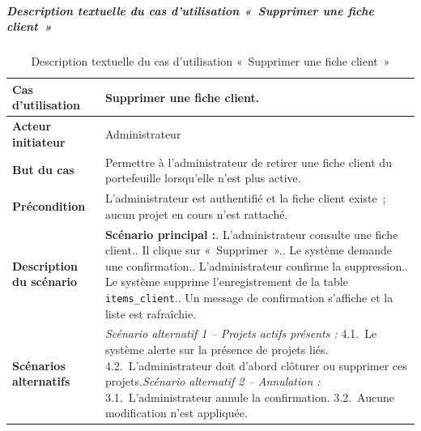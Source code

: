 \subparagraph{Description textuelle du cas d'utilisation «~Supprimer une fiche client~»}

\begin{table}[H]
  \caption{Description textuelle du cas d'utilisation «~Supprimer une fiche client~»}
  \label{tab:cu-supprimer-client}
  \centering
  \begin{tabularx}{\textwidth}{|L{3.8cm}|X|}
    \hline
    \textbf{Cas d'utilisation} & Supprimer une fiche client. \\
    \hline
    \textbf{Acteur initiateur} & Administrateur \\
    \hline
    \textbf{But du cas} & Permettre à l'administrateur de retirer une fiche client du portefeuille lorsqu'elle n'est plus active. \\
    \hline
    \textbf{Précondition} & L'administrateur est authentifié et la fiche client existe~; aucun projet en cours n'est rattaché. \\
    \hline
    \textbf{Description du scénario} &
    \textbf{Scénario principal :}. L'administrateur consulte une fiche client.. Il clique sur «~Supprimer~».. Le système demande une confirmation.. L'administrateur confirme la suppression.. Le système supprime l'enregistrement de la table \texttt{items\_client}.. Un message de confirmation s'affiche et la liste est rafraîchie.\\
    \hline
    \textbf{Scénarios alternatifs} &
    \textit{Scénario alternatif 1 -- Projets actifs présents :}\newline
    \hspace*{6pt}4.1.~Le système alerte sur la présence de projets liés.\newline
    \hspace*{6pt}4.2.~L'administrateur doit d'abord clôturer ou supprimer ces projets.\newline[2pt]
    \textit{Scénario alternatif 2 -- Annulation :}\newline
    \hspace*{6pt}3.1.~L'administrateur annule la confirmation.\newline
    \hspace*{6pt}3.2.~Aucune modification n'est appliquée.\\
    \hline
  \end{tabularx}
\end{table}


